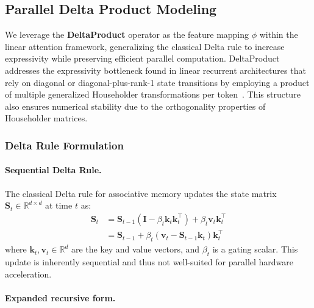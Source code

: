 \documentclass[10pt,a4paper]{article}
\begin{document}

\subsection{Parallel Delta Product Modeling}

We leverage the \textbf{DeltaProduct} operator as the feature mapping $\phi$ within the linear attention framework, generalizing the classical Delta rule to increase expressivity while preserving efficient parallel computation. DeltaProduct addresses the expressivity bottleneck found in linear recurrent architectures that rely on diagonal or diagonal-plus-rank-1 state transitions by employing a product of multiple generalized Householder transformations per token~\cite{siems2025deltaproduct}. This structure also ensures numerical stability due to the orthogonality properties of Householder matrices.

\subsubsection{Delta Rule Formulation}


\paragraph{Sequential Delta Rule.}

The classical Delta rule for associative memory updates the state matrix $\mathbf{S}_t \in \mathbb{R}^{d \times d}$ at time $t$ as:
\begin{align}
    \mathbf{S}_t &= \mathbf{S}_{t-1} \left(\mathbf{I}  - \beta_t \mathbf{k}_t  \mathbf{k}_t^\top \right) + \beta_t \mathbf{v}_t \mathbf{k}_t^\top \\
    &= \mathbf{S}_{t-1} + \beta_t \left( \mathbf{v}_t - \mathbf{S}_{t-1} \mathbf{k}_t \right) \mathbf{k}_t^\top
    \label{eq:deltarule}
\end{align}
where $\mathbf{k}_t, \mathbf{v}_t \in \mathbb{R}^d$ are the key and value vectors, and $\beta_t$ is a gating scalar. This update is inherently sequential and thus not well-suited for parallel hardware acceleration.

\paragraph{Expanded recursive form.}
\end{document}

